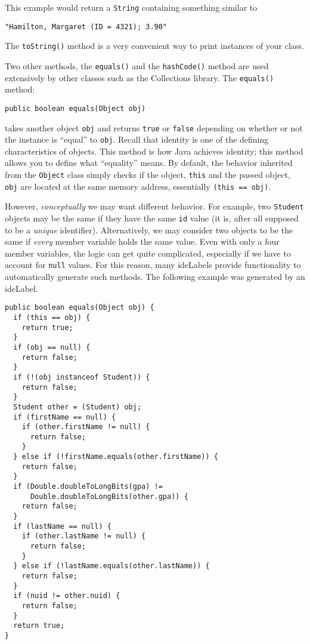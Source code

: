 This example would return a \texttt{String} containing 
something similar to

\texttt{"Hamilton, Margaret (ID = 4321); 3.90"}

The \texttt{toString()} method is a very convenient way to
print instances of your class.  

Two other methods, the \texttt{equals()} and the
\texttt{hashCode()} method are used extensively by
other classes such as the Collections library.  The 
\texttt{equals()} method:

\texttt{public boolean equals(Object obj)}

takes another object \texttt{obj} and returns 
\texttt{true} or \texttt{false} depending on 
whether or not the instance is ``equal'' to \texttt{obj}.
Recall that identity is one of the defining characteristics of
objects.  This method is how Java achieves identity; this method allows you to 
define what ``equality'' means.  By default, the behavior
inherited from the \texttt{Object} class simply checks
if the object, \texttt{this} and the passed object, 
\texttt{obj} are located at the same memory address, 
essentially \texttt{(this == obj)}.  

However, \emph{conceptually} we may want different behavior.
For example, two \texttt{Student} objects may be the
same if they have the same \texttt{id} value (it is, 
after all supposed to be a \emph{unique} identifier).  Alternatively, 
we may consider two objects to be the same if \emph{every} 
member variable holds the same value.  Even with only a four
member variables, the logic can get quite complicated, especially
if we have to account for \texttt{null} values.
For this reason, many \glspl{ideLabel} provide functionality to
automatically generate such methods.  The following example was
generated by an \gls{ideLabel}.

\begin{verbatim}
public boolean equals(Object obj) {
  if (this == obj) {
    return true;
  }
  if (obj == null) {
    return false;
  }
  if (!(obj instanceof Student)) {
    return false;
  }
  Student other = (Student) obj;
  if (firstName == null) {
    if (other.firstName != null) {
      return false;
    }
  } else if (!firstName.equals(other.firstName)) {
    return false;
  }
  if (Double.doubleToLongBits(gpa) != 
      Double.doubleToLongBits(other.gpa)) {
    return false;
  }
  if (lastName == null) {
    if (other.lastName != null) {
      return false;
    }
  } else if (!lastName.equals(other.lastName)) {
    return false;
  }
  if (nuid != other.nuid) {
    return false;
  }
  return true;
}
\end{verbatim}

